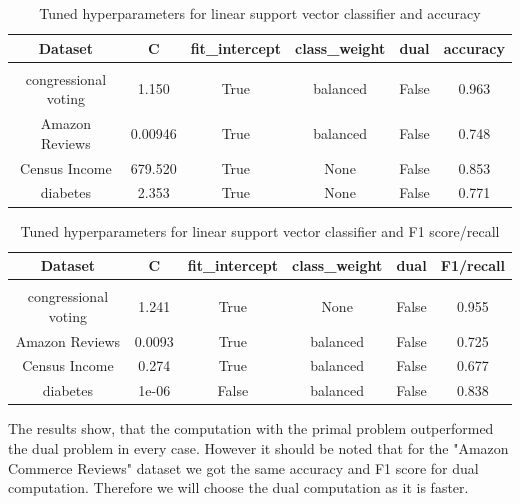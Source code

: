 \documentclass[a4paper,10pt]{article}
\begin{document}
\begin{table}[h!]
    \centering
    \begin{tabular}{|c|c|c|c|c|c|}
    \hline
    Dataset & \textsf{C} & \textsf{fit\_intercept} &  \textsf{class\_weight} & \textsf{dual} & accuracy \\
    \hline
    \multicolumn{6}{c}{\vspace{-0.4cm}} \\ %
    \hline
    congressional voting & 1.150 & True & balanced & False & 0.963 \\%
    \hline
    Amazon Reviews & 0.00946 & True & balanced & False & 0.748 \\%
    \hline
    Census Income & 679.520 & True & None & False & 0.853 \\%
    \hline
    diabetes & 2.353 & True & None & False  & 0.771 \\%
    \hline
    \end{tabular}
    \caption{Tuned hyperparameters for linear support vector classifier and accuracy} 
    \label{table:tu_hyp_svc_ac}
    \end{table}

\begin{table}[h!]
    \centering
    \begin{tabular}{|c|c|c|c|c|c|}
    \hline
    Dataset & \textsf{C} & \textsf{fit\_intercept} &  \textsf{class\_weight} & \textsf{dual} & F1/recall \\
    \hline
    \multicolumn{6}{c}{\vspace{-0.4cm}} \\ %
    \hline
    congressional voting & 1.241 & True & None & False & 0.955 \\%
    \hline
    Amazon Reviews & 0.0093 & True & balanced & False &  0.725 \\%
    \hline
    Census Income & 0.274 & True & balanced & False & 0.677 \\%
    \hline
    diabetes & 1e-06 & False & balanced & False  & 0.838 \\%
    \hline
    \end{tabular}
    \caption{Tuned hyperparameters for linear support vector classifier and F1 score/recall} 
    \label{table:tu_hyp_svc_f1}
    \end{table}
    
The results show, that the computation with the primal problem outperformed the dual problem in every case. However it should be noted that for the "Amazon Commerce Reviews" dataset we got the same accuracy and F1 score for dual computation. Therefore we will choose the dual computation as it is faster.
\end{document}
